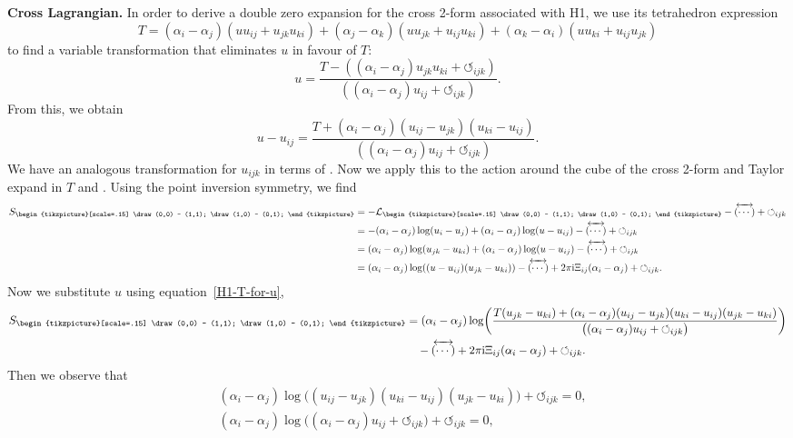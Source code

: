 \documentclass[10pt,a4paper]{amsart}
\newcommand{\inversion}[1]{\!\overleftrightarrow{\,#1\,}\!}
\newcommand{\reverse}{{\,\overleftrightarrow{\!(\cdots)\!}\,}}
\newcommand{\cross}{{\begin{tikzpicture}[scale=.15]
			\draw (0,0) -- (1,1);
			\draw (1,0) -- (0,1);
\end{tikzpicture}}}
\newcommand{\cyclic}{{\circlearrowleft}_{ijk}}
\newcommand{\cL}{\mathcal{L}}
\numberwithin{equation}{section}
\begin{document}
{\bf Cross Lagrangian.}
In order to derive a double zero expansion for the cross 2-form associated with H1, we use its tetrahedron expression
\[ T = (\alpha_i-\alpha_j)(u u_{ij} + u_{jk}u_{ki})
+ (\alpha_j-\alpha_k)(u u_{jk} + u_{ij} u_{ki})
+ (\alpha_k-\alpha_i)(u u_{ki} + u_{ij} u_{jk} ) \]
to find a variable transformation that eliminates $u$ in favour of $T$:
\[
 u = \frac{T - ( (\alpha_i-\alpha_j) u_{jk} u_{ki} + \cyclic ) }{( (\alpha_i - \alpha_j) u_{ij} + \cyclic ) } .
\]
From this, we obtain
\begin{equation}
 \label{H1-T-for-u}
 u - u_{ij} = \frac{T + (\alpha_i-\alpha_j) (u_{ij} - u_{jk})(u_{ki} - u_{ij}) }{( (\alpha_i - \alpha_j) u_{ij} + \cyclic ) } .
\end{equation}
We have an analogous transformation for $u_{ijk}$ in terms of \smash{$\inversion T$}. Now we apply this to the action around the cube of the cross 2-form and Taylor expand in $T$ and \smash{$\inversion T$}.
Using the point inversion symmetry, we find
\begin{align*}
\begin{split}
 S_\cross
 & = -\cL_\cross -\reverse + \cyclic \\
 &= -(\alpha_i - \alpha_j) \log(u_i - u_j) + (\alpha_i - \alpha_j) \log(u - u_{ij}) -\reverse + \cyclic \\
 &= (\alpha_i - \alpha_j) \log(u_{jk} - u_{ki}) + (\alpha_i - \alpha_j) \log(u - u_{ij}) -\reverse + \cyclic \\
 &= (\alpha_i - \alpha_j) \log ((u - u_{ij})(u_{jk} - u_{ki})) - \reverse + 2 \pi {\rm i} \Xi_{ij} (\alpha_i-\alpha_j) + \cyclic .
 \end{split}
\end{align*}
Now we substitute $u$ using equation~\eqref{H1-T-for-u},
\begin{align*}
 S_\cross &= (\alpha_i - \alpha_j) \log \biggl( \frac{T(u_{jk} - u_{ki}) + (\alpha_i-\alpha_j) (u_{ij} - u_{jk})(u_{ki} - u_{ij})(u_{jk} - u_{ki}) }{\bigl( (\alpha_i - \alpha_j) u_{ij} + \cyclic \bigr) } \biggr) \\
 &\quad{}- \reverse + 2 \pi {\rm i} \Xi_{ij} (\alpha_i-\alpha_j) + \cyclic .
\end{align*}
Then we observe that
\begin{align*}
& (\alpha_i - \alpha_j) \log \bigl( (u_{ij} - u_{jk})(u_{ki} - u_{ij})(u_{jk} - u_{ki}) \bigr) + \cyclic= 0 , \\
& (\alpha_i - \alpha_j) \log \bigl( (\alpha_i - \alpha_j) u_{ij} + \cyclic \bigr) + \cyclic= 0 ,
\end{align*}
\end{document}
